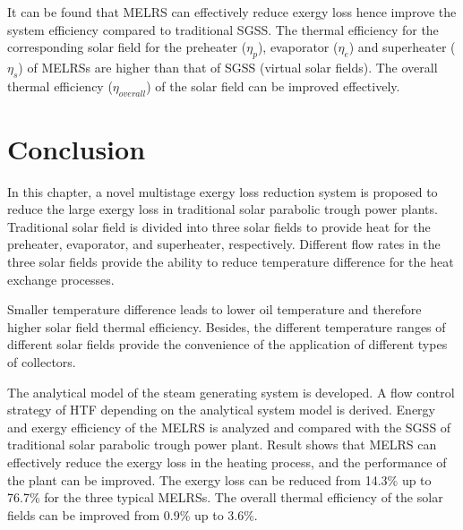 It can be found that MELRS can effectively reduce exergy loss hence improve the system efficiency compared to traditional SGSS. The thermal efficiency for the corresponding solar field for the preheater ($\eta_p$), evaporator ($\eta_e$) and superheater ($\eta_s$) of MELRSs are higher than that of SGSS (virtual solar fields).
The overall thermal efficiency ($\eta_{overall}$) of the solar field can be improved effectively.

\section{Conclusion}

In this chapter, a novel multistage exergy loss reduction system is proposed to reduce the large exergy loss in traditional solar parabolic trough power plants.
Traditional solar field is divided into three solar fields to provide heat for the preheater, evaporator, and superheater, respectively. Different flow rates in the three solar fields provide the ability to reduce temperature difference for the heat exchange processes.

Smaller temperature difference leads to lower oil temperature and therefore higher solar field thermal efficiency. Besides, the different temperature ranges of different solar fields provide the convenience of the application of different types of collectors.

The analytical model of the steam generating system is developed. A flow control strategy of HTF depending on the analytical system model is derived. Energy and exergy efficiency of the MELRS is analyzed and compared with the SGSS of traditional solar parabolic trough power plant. Result shows that MELRS can effectively reduce the exergy loss in the heating process, and the performance of the plant can be improved. The exergy loss can be reduced from 14.3\% up to 76.7\% for the three typical MELRSs. The overall thermal efficiency of the solar fields can be improved from 0.9\% up to 3.6\%.